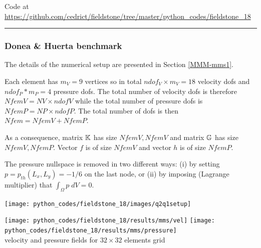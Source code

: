 

\begin{center}
Code at \url{https://github.com/cedrict/fieldstone/tree/master/python_codes/fieldstone_18}
\end{center}

\par\noindent\rule{\textwidth}{0.4pt}

\subsubsection*{Donea \& Huerta benchmark}
The details of the numerical setup are presented in Section \ref{MMM-mms1}.

Each element has $m_V=9$ vertices so in total $ndof_V\times m_V=18$ velocity dofs and 
$ndof_P*m_P=4$ pressure dofs. The total number of 
velocity dofs is therefore $NfemV=NV \times ndofV$ while the total number of
pressure dofs is $NfemP=NP\times ndofP$. The total number of dofs is then $Nfem=NfemV+NfemP$.

As a consequence, matrix ${\mathbb{K}}$ has size $NfemV,NfemV$ and matrix ${\mathbb{G}}$ has size $NfemV,NfemP$.
Vector $f$ is of size $NfemV$ and vector $h$ is of size $NfemP$.  

The pressure nullspace is removed in two different ways:
(i) by setting $p=p_{th}(L_x,L_y)=-1/6$ on the last node, or (ii)
by imposing (Lagrange multiplier) that $\int_\Omega p \; dV=0$.

\begin{center}
\texttt{[image: python\_codes/fieldstone\_18/images/q2q1setup]}
\end{center}

\begin{center}
\texttt{[image: python\_codes/fieldstone\_18/results/mms/vel]}
\texttt{[image: python\_codes/fieldstone\_18/results/mms/pressure]}\\
{\captionfont velocity and pressure fields for $32\times 32$ elements grid}
\end{center}

